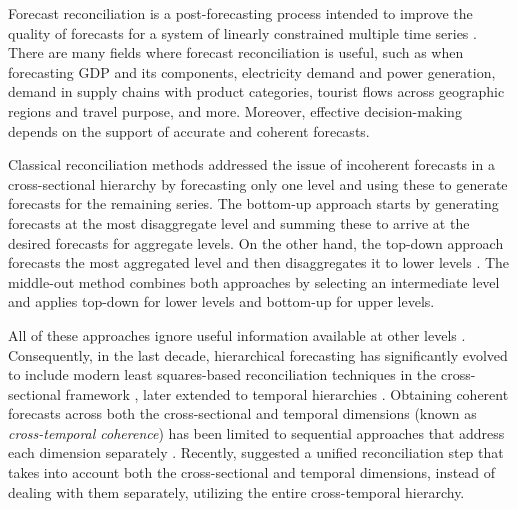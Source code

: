 \documentclass[a4paper,11pt]{article}
\theoremstyle{definition}
\begin{document}
Forecast reconciliation is a post-forecasting process intended to improve the quality of forecasts for a system of linearly constrained multiple time series \citep{hyndman2011, panagiotelis2021}. There are many fields where forecast reconciliation is useful, such as when forecasting GDP and its components, electricity demand and power generation, demand in supply chains with product categories, tourist flows across geographic regions and travel purpose, and more. Moreover, effective decision-making depends on the support of accurate and coherent forecasts.

Classical reconciliation methods addressed the issue of incoherent forecasts in a cross-sectional hierarchy by forecasting only one level and using these to generate forecasts for the remaining series. The bottom-up approach \citep{dunn1976} starts by generating forecasts at the most disaggregate level and summing these to arrive at the desired forecasts for aggregate levels. On the other hand, the top-down approach \citep{gross1990} forecasts the most aggregated level and then disaggregates it to lower levels \citep{fliedner2001, athanasopoulos2009}. The middle-out method \citep{athanasopoulos2009} combines both approaches by selecting an intermediate level and applies top-down for lower levels and bottom-up for upper levels.

All of these approaches ignore useful information available at other levels \citep{pennings2017}. Consequently, in the last decade, hierarchical forecasting has significantly evolved to include modern least squares-based reconciliation techniques in the cross-sectional framework \citep{hyndman2011, wickramasuriya2019, panagiotelis2021}, later extended to temporal hierarchies \citep{athanasopoulos2017, nystrup2020}. Obtaining coherent forecasts across both the cross-sectional and temporal dimensions (known as \textit{cross-temporal coherence}) has been limited to sequential approaches that address each dimension separately \citep{kourentzes2019, yagli2019, punia2020, spiliotis2020}. Recently, \citet{difonzo2023} suggested a unified reconciliation step that takes into account both the cross-sectional and temporal dimensions, instead of dealing with them separately, utilizing the entire cross-temporal hierarchy.
\end{document}
